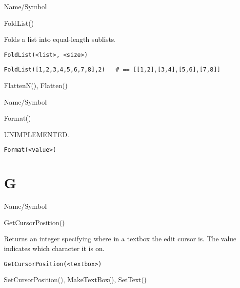 \rl


\begin{desc}{Name/Symbol}
\item[Name/Symbol]	FoldList()

\item[Description]	Folds a list into equal-length sublists.

\item[Usage]
\begin{verbatim}
FoldList(<list>, <size>)
\end{verbatim}

\item[Example]
\begin{verbatim}
FoldList([1,2,3,4,5,6,7,8],2)	# == [[1,2],[3,4],[5,6],[7,8]]
\end{verbatim}
 
\item[See Also]	FlattenN(), Flatten()
\end{desc}

\rl



\begin{desc}{Name/Symbol}
\item[Name/Symbol]	Format()            

\item[Description]	UNIMPLEMENTED.

\item[Usage]
\begin{verbatim}
Format(<value>)
\end{verbatim}

\item[Example]	

\item[See Also]	
\end{desc}

\rl
\section{G}
\rl


\begin{desc}{Name/Symbol}
\item[Name/Symbol]	GetCursorPosition()

\item[Description]	Returns an integer specifying where in a textbox the edit cursor is.  The value indicates which character it is on.

\item[Usage]
\begin{verbatim}
GetCursorPosition(<textbox>)
\end{verbatim}

\item[Example]	

\item[See Also]	SetCursorPosition(), MakeTextBox(), SetText()
\end{desc}

